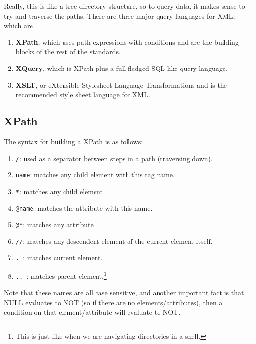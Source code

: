 \documentclass{article}
\begin{document}
    Really, this is like a tree directory structure, so to query data, it makes sense to try and traverse the paths. There are three major query languages for XML, which are 
    \begin{enumerate}
      \item \textbf{XPath}, which uses path expressions with conditions and are the building blocks of the rest of the standards. 
      \item \textbf{XQuery}, which is XPath plus a full-fledged SQL-like query language. 
      \item \textbf{XSLT}, or eXtensible Stylesheet Language Transformations and is the recommended style sheet language for XML. 
    \end{enumerate}

  \subsection{XPath}

    \begin{definition}
      The syntax for building a XPath is as follows: 
      \begin{enumerate}
        \item \texttt{/}: used as a separator between steps in a path (traversing down). 
        \item \texttt{name}: matches any child element with this tag name. 
        \item \texttt{*}: matches any child element 
        \item \texttt{@name}: matches the attribute with this name. 
        \item \texttt{@*}: matches any attribute 
        \item \texttt{//}: matches any descendent element of the current element itself. 
        \item \texttt{. }: matches current element.
        \item \texttt{.. }: matches parent element.\footnote{This is just like when we are navigating directories in a shell.}
      \end{enumerate}
      Note that these names are all case sensitive, and another important fact is that NULL evaluates to NOT (so if there are no elements/attributes), then a condition on that element/attribute will evaluate to NOT. 
    \end{definition}
\end{document}
